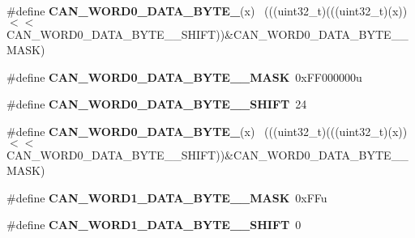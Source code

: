 \begin{DoxyCompactItemize}
\item 
\hypertarget{group___c_a_n___register___masks_ga2ec9434e1f8983ec432f20519935e9d1}{}\#define {\bfseries C\+A\+N\+\_\+\+W\+O\+R\+D0\+\_\+\+D\+A\+T\+A\+\_\+\+B\+Y\+T\+E\+\_}(x)                              ~(((uint32\+\_\+t)(((uint32\+\_\+t)(x))$<$$<$C\+A\+N\+\_\+\+W\+O\+R\+D0\+\_\+\+D\+A\+T\+A\+\_\+\+B\+Y\+T\+E\+\_\+\_\+\+S\+H\+I\+F\+T))\&C\+A\+N\+\_\+\+W\+O\+R\+D0\+\_\+\+D\+A\+T\+A\+\_\+\+B\+Y\+T\+E\+\_\+\_\+\+M\+A\+S\+K)\label{group___c_a_n___register___masks_ga2ec9434e1f8983ec432f20519935e9d1}

\item 
\hypertarget{group___c_a_n___register___masks_ga850d4e3257b02cacead5d9e2b757818c}{}\#define {\bfseries C\+A\+N\+\_\+\+W\+O\+R\+D0\+\_\+\+D\+A\+T\+A\+\_\+\+B\+Y\+T\+E\+\_\+\_\+\+M\+A\+S\+K}~0x\+F\+F000000u\label{group___c_a_n___register___masks_ga850d4e3257b02cacead5d9e2b757818c}

\item 
\hypertarget{group___c_a_n___register___masks_gaf84582fa0ea01d047081e02025634145}{}\#define {\bfseries C\+A\+N\+\_\+\+W\+O\+R\+D0\+\_\+\+D\+A\+T\+A\+\_\+\+B\+Y\+T\+E\+\_\+\_\+\+S\+H\+I\+F\+T}~24\label{group___c_a_n___register___masks_gaf84582fa0ea01d047081e02025634145}

\item 
\hypertarget{group___c_a_n___register___masks_ga9490e4d0519b4213fd46de41c417f90f}{}\#define {\bfseries C\+A\+N\+\_\+\+W\+O\+R\+D0\+\_\+\+D\+A\+T\+A\+\_\+\+B\+Y\+T\+E\+\_}(x)                              ~(((uint32\+\_\+t)(((uint32\+\_\+t)(x))$<$$<$C\+A\+N\+\_\+\+W\+O\+R\+D0\+\_\+\+D\+A\+T\+A\+\_\+\+B\+Y\+T\+E\+\_\+\_\+\+S\+H\+I\+F\+T))\&C\+A\+N\+\_\+\+W\+O\+R\+D0\+\_\+\+D\+A\+T\+A\+\_\+\+B\+Y\+T\+E\+\_\+\_\+\+M\+A\+S\+K)\label{group___c_a_n___register___masks_ga9490e4d0519b4213fd46de41c417f90f}

\item 
\hypertarget{group___c_a_n___register___masks_ga55f9bc8ccdbb2f34f1b571eff8481537}{}\#define {\bfseries C\+A\+N\+\_\+\+W\+O\+R\+D1\+\_\+\+D\+A\+T\+A\+\_\+\+B\+Y\+T\+E\+\_\+\_\+\+M\+A\+S\+K}~0x\+F\+Fu\label{group___c_a_n___register___masks_ga55f9bc8ccdbb2f34f1b571eff8481537}

\item 
\hypertarget{group___c_a_n___register___masks_gacff5d21eb80fe537f40b518e58750186}{}\#define {\bfseries C\+A\+N\+\_\+\+W\+O\+R\+D1\+\_\+\+D\+A\+T\+A\+\_\+\+B\+Y\+T\+E\+\_\+\_\+\+S\+H\+I\+F\+T}~0\label{group___c_a_n___register___masks_gacff5d21eb80fe537f40b518e58750186}


\end{DoxyCompactItemize}
